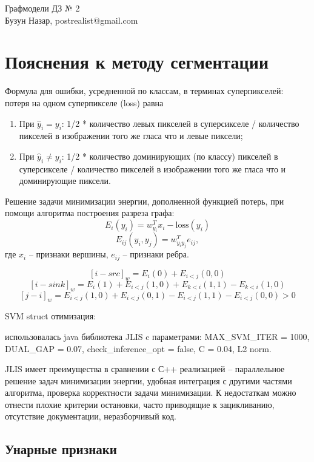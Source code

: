 \documentclass[russian,10pt,a4paper]{article}
\makeatletter
\def\maketitle{
  \begin{center}
  
{\large Графмодели ДЗ № 2 } \\ 
Бузун Назар, postrealist@gmail.com
  \end{center}
}
\theoremstyle{definition}
\makeatother
\begin{document}
\maketitle

\section{Пояснения к методу сегментации}

Формула для ошибки, усредненной по классам, в терминах суперпикселей:  потеря на одном суперпикселе (loss) равна 
\begin{enumerate}
\item При $\widehat{y}_i = y_i$:  1/2 * количество левых пикселей в суперсикселе / количество пикселей в изображении того же гласа что и левые пиксели;
\item При $\widehat{y}_i \neq y_i$:  1/2 * количество доминирующих (по классу) пикселей в суперсикселе / количество пикселей в изображении того же гласа что и доминирующие пиксели.
\end{enumerate}


Решение задачи минимизации энергии, дополненной функцией потерь, при помощи алгоритма построения разреза графа:
\[
E_i(y_i) = w_{y_i}^T  x_i - \mathrm{loss}(y_i)
\]
\[
E_{ij}(y_i, y_j) = w_{y_i y_j}^T  e_{ij}, 
\]
где $x_{i}$ -- признаки вершины,  $e_{ij}$ -- признаки ребра.

\[
[i-src]_w = E_i(0) +  E_{i<j}(0, 0) 
\]
\[ 
[i-sink]_w = E_i(1) +  E_{i<j}(1, 0) + E_{k<i}(1, 1) - E_{k<i}(1, 0)  
\]
\[
[j-i]_w = E_{i<j}(1, 0) + E_{i<j}(0, 1) - E_{i<j}(1, 1) -E_{i<j}(0, 0) > 0  
\]



SVM struct отимизация: 

использовалась java библиотека JLIS c параметрами:
MAX\_SVM\_ITER = 1000, DUAL\_GAP = 0.07, check\_inference\_opt = false, C = 0.04, L2 norm.

JLIS имеет преимущества в сравнении с С++ реализацией -- параллельное решение задач минимизации энергии, удобная интеграция с другими частями алгоритма, проверка корректности задачи минимизации.    
К недостаткам можно отнести плохие критерии остановки, часто приводящие к зацикливанию, отсутствие документации, неразборчивый код.

\subsection*{Унарные признаки}
\end{document}
